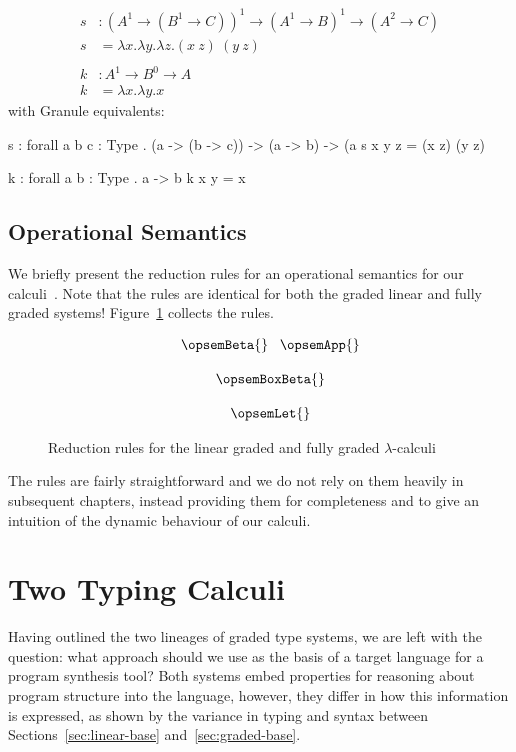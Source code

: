 \begin{example}
\begin{align*}
s & : (A^1 \rightarrow (B^1 \rightarrow C))^1 \rightarrow (A^1 \rightarrow B)^1 \rightarrow (A^2 \rightarrow C) \\
s & = \lambda x . \lambda y . \lambda z . (x\ z)\ (y\ z)\\
\\
k & : A^1 \rightarrow B^0 \rightarrow A \\
k & = \lambda x . \lambda y . x 
\end{align*}
with Granule equivalents:
\begin{granule}
s : forall { a b c : Type } 
  . (a -> (b -> c)) -> (a -> b) -> (a %
s x y z = (x z) (y z)

k : forall { a b : Type } . a -> b %
k x y = x 
\end{granule}
\end{example}

\subsection{Operational Semantics}
\label{sec:op-sem}
We briefly present the reduction rules for an operational semantics for our
calculi~\citep{tale-of-two-calculi}. Note that the rules are identical for both the graded linear and fully
graded systems! Figure~\ref{fig:opsem} collects the rules.
\begin{figure}[H]
\begin{align*}
\hspace{1.5em}
\begin{array}{c}
\opsemBeta{}
\;\;\;
\opsemApp{}
\\[1.25em]
\opsemBoxBeta{}
\\[1.25em]
\opsemLet{}
\end{array}
\end{align*}
\vspace{-0.5em}
\caption{Reduction rules for the linear graded and fully graded $\lambda$-calculi}
\label{fig:opsem}
\vspace{-0.5em}
 \end{figure}
 The rules are fairly straightforward and we do not rely on them heavily in
 subsequent chapters, instead providing them for completeness and to give an
 intuition of the dynamic behaviour of our calculi. 



\section{Two Typing Calculi}
\label{sec:two-typing}
Having outlined the two lineages of graded type systems, we are left with the
question: what approach should we use as the basis of a target language for a
program synthesis tool? Both systems embed properties for reasoning about
program structure into the language, however, they differ in how this
information is expressed, as shown by the variance in typing and syntax between
Sections~\ref{sec:linear-base} and~\ref{sec:graded-base}. 

